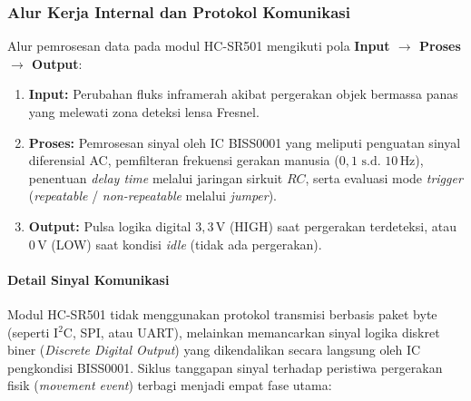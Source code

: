 \subsubsection{Alur Kerja Internal dan Protokol Komunikasi}
Alur pemrosesan data pada modul HC-SR501 mengikuti pola \textbf{Input $\rightarrow$ Proses $\rightarrow$ Output}:
\begin{enumerate}
	\item \textbf{Input:} Perubahan fluks inframerah akibat pergerakan objek bermassa panas yang melewati zona deteksi lensa Fresnel.
	\item \textbf{Proses:} Pemrosesan sinyal oleh IC BISS0001 yang meliputi penguatan sinyal diferensial AC, pemfilteran frekuensi gerakan manusia ($0{,}1\text{ s.d. }10\,\text{Hz}$), penentuan \textit{delay time} melalui jaringan sirkuit $RC$, serta evaluasi mode \textit{trigger} (\textit{repeatable} / \textit{non-repeatable} melalui \textit{jumper}).
	\item \textbf{Output:} Pulsa logika digital $3{,}3\,\text{V}$ (HIGH) saat pergerakan terdeteksi, atau $0\,\text{V}$ (LOW) saat kondisi \textit{idle} (tidak ada pergerakan).
\end{enumerate}

\paragraph{Detail Sinyal Komunikasi}
Modul HC-SR501 tidak menggunakan protokol transmisi berbasis paket byte (seperti I$^2$C, SPI, atau UART), melainkan memancarkan sinyal logika diskret biner (\textit{Discrete Digital Output}) yang dikendalikan secara langsung oleh IC pengkondisi BISS0001. Siklus tanggapan sinyal terhadap peristiwa pergerakan fisik (\textit{movement event}) terbagi menjadi empat fase utama:

